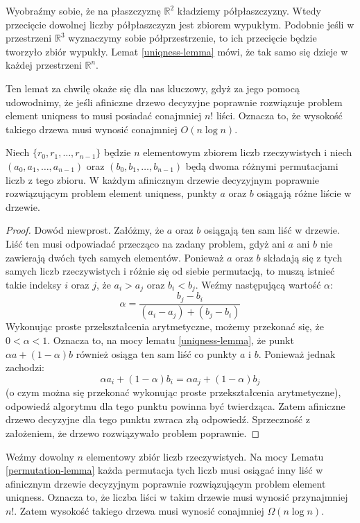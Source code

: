 Wyobraźmy sobie, że na płaszczyznę $\mathbb{R}^2$ kładziemy półpłaszczyzny.
Wtedy przecięcie dowolnej liczby półpłaszczyzn jest zbiorem wypukłym.
Podobnie jeśli w przestrzeni $\mathbb{R}^3$ wyznaczymy sobie półprzestrzenie, to ich przecięcie będzie tworzyło zbiór wypukły.
Lemat \ref{uniqness-lemma} mówi, że tak samo się dzieje w każdej przestrzeni $\mathbb{R}^n$.

Ten lemat za chwilę okaże się dla nas kluczowy, gdyż za jego pomocą udowodnimy, że jeśli afiniczne drzewo decyzyjne poprawnie rozwiązuje problem element uniqness to musi posiadać conajmniej $n!$ liści.
Oznacza to, że wysokość takiego drzewa musi wynosić conajmniej $O(n \log n)$.

\begin{lemma}
 \label{permutation-lemma}
 Niech $\{r_0, r_1, \ldots, r_{n-1}\}$ będzie $n$ elementowym zbiorem liczb rzeczywistych i niech $(a_0, a_1, \ldots, a_{n-1})$ oraz $(b_0, b_1, \ldots, b_{n-1})$ będą dwoma różnymi permutacjami liczb z tego zbioru.
 W każdym afinicznym drzewie decyzyjnym poprawnie rozwiązującym problem element uniqness, punkty $a$ oraz $b$ osiągają różne liście w drzewie.
\end{lemma}

\begin{proof}
 Dowód niewprost.
 Załóżmy, że $a$ oraz $b$ osiągają ten sam liść w drzewie.
 Liść ten musi odpowiadać przecząco na zadany problem, gdyż ani $a$ ani $b$ nie zawierają dwóch tych samych elementów.
 Ponieważ $a$ oraz $b$ składają się z tych samych liczb rzeczywistych i różnie się od siebie permutacją, to muszą istnieć takie indeksy $i$ oraz $j$, że $a_i > a_j$ oraz $b_i < b_j$.
 Weźmy następującą wartość $\alpha$:
 \[
  \alpha = \frac{b_j - b_i}{(a_i - a_j) + (b_j - b_i)}
 \]
 Wykonując proste przekształcenia arytmetyczne, możemy przekonać się, że $0 < \alpha < 1$.
 Oznacza to, na mocy lematu \ref{uniqness-lemma}, że punkt $\alpha a + (1 - \alpha)b$ również osiąga ten sam liść co punkty $a$ i $b$.
 Ponieważ jednak zachodzi:
 \[
  \alpha a_i + (1 - \alpha) b_i = \alpha a_j + (1 - \alpha) b_j
 \]
 (o czym można się przekonać wykonując proste przekształcenia arytmetyczne), odpowiedź algorytmu dla tego punktu powinna być twierdząca.
 Zatem afiniczne drzewo decyzyjne dla tego punktu zwraca złą odpowiedź.
 Sprzeczność z założeniem, że drzewo rozwiązywało problem poprawnie.
\end{proof}

Weźmy dowolny $n$ elementowy zbiór liczb rzeczywistych.
Na mocy Lematu \ref{permutation-lemma} każda permutacja tych liczb musi osiągać inny liść w afinicznym drzewie decyzyjnym poprawnie rozwiązującym problem element uniqness.
Oznacza to, że liczba liści w takim drzewie musi wynosić przynajmniej $n!$.
Zatem wysokość takiego drzewa musi wynosić conajmniej $\Omega(n \log n)$.
